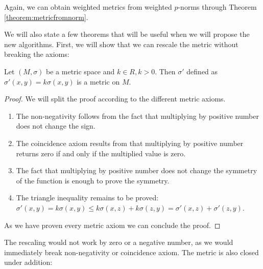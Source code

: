 	 Again, we can obtain weighted metrics from weighted $p$-norms through Theorem \ref{theorem:metricfromnorm}.
	
	We will also state a few theorems that will be useful when we will propose the new algorithms.
	First, we will show that we can rescale the metric without breaking the axioms:
	
	\begin{theorem}
		\label{theorem:metricrescaling}
		Let $(M,\sigma)$ be a metric space and $k \in R, k > 0$. Then $\sigma'$ defined as $\sigma'(x,y)=k\sigma(x,y)$ is a metric on $M$.
		
		\begin{proof}
			We will split the proof according to the different metric axioms.
			\begin{enumerate}
				\item The non-negativity follows from the fact that multiplying by positive number does not change the sign.
				\item The coincidence axiom results from that multiplying by positive number returns zero if and only if the multiplied value is zero.
				\item The fact that multiplying by positive number does not change the symmetry of the function is enough to prove the symmetry.
				\item The triangle inequality remains to be proved: $\sigma'(x,y)=k\sigma(x,y) \le k\sigma(x,z)+k\sigma(z,y)=\sigma'(x,z)+\sigma'(z,y)$.
			\end{enumerate}
			As we have proven every metric axiom we can conclude the proof.
		\end{proof}
	\end{theorem}
	
	The rescaling would not work by zero or a negative number, as we would immediately break non-negativity or coincidence axiom.
	The metric is also closed under addition:
	
